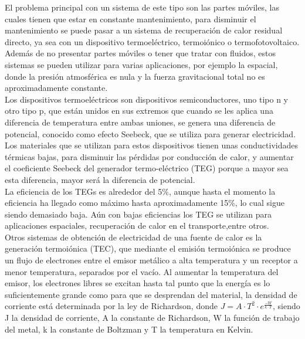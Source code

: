 El problema principal con un sistema de este tipo son las partes móviles, las cuales tienen que estar en constante mantenimiento, para disminuir el mantenimiento se puede pasar a un sistema de recuperación de calor residual directo, ya sea con un dispositivo termoeléctrico, termoiónico o termofotovoltaico. Además de no presentar partes móviles o tener que tratar con fluidos, estos sistemas se pueden utilizar para varias aplicaciones, por ejemplo la espacial, donde la presión atmosférica es nula y la fuerza gravitacional total no es aproximadamente constante.\\

Los dispositivos termoeléctricos son dispositivos semiconductores, uno tipo n y otro tipo p, que están unidos en sus extremos que cuando se les aplica una diferencia de temperatura entre ambas uniones, se genera una diferencia de potencial, conocido como efecto Seebeck, que se utiliza para generar electricidad. Los materiales que se utilizan para estos dispositivos tienen unas conductividades térmicas bajas, para disminuir las pérdidas por conducción de calor, y aumentar el coeficiente Seebeck del generador termo-eléctrico (TEG) porque a mayor sea esta diferencia, mayor será la diferencia de potencial.\\

La eficiencia de los TEGs es alrededor del 5\%, aunque hasta el momento la eficiencia ha llegado como máximo hasta aproximadamente 15\%, lo cual sigue siendo demasiado baja. Aún con bajas eficiencias los TEG se utilizan para aplicaciones espaciales, recuperación de calor en el transporte,entre otros.\\


Otros sistemas de obtención de electricidad de una fuente de calor es la generación termoiónica (TEC), que mediante el emisión termoiónica se produce un flujo de electrones entre el emisor metálico a alta temperatura y un receptor a menor temperatura, separados por el vacío. Al aumentar la temperatura del emisor, los electrones libres se excitan hasta tal punto que la energía es lo suficientemente grande como para que se desprendan del material, la densidad de corriente está determinada por la ley de Richardson, donde $J=A\cdot T^2\cdot e^{\frac{-W}{k\cdot T}}$, siendo J la densidad de corriente, A la constante de Richardson, W la función de trabajo del metal, k la constante de Boltzman y T la temperatura en Kelvin.\\

